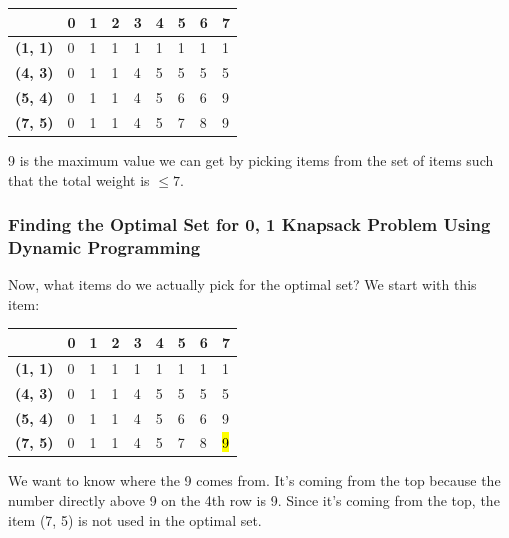 \documentclass{article}
\begin{document}
\begin{center}
\begin{tabular}{|l|l|l|l|l|l|l|l|l|}
\hline
                & \textbf{0} & \textbf{1} & \textbf{2} & \textbf{3} & \textbf{4} & \textbf{5} & \textbf{6} & \textbf{7} \\ \hline
\textbf{(1, 1)} & 0          &1            &1            &1            &1            &1            &1            &1            \\ \hline
\textbf{(4, 3)} & 0          &1            &1            &4            &5            &5            &  5          &  5          \\ \hline
\textbf{(5, 4)} & 0          &1            &1            &4            &5            &6            &6            & 9           \\ \hline
\textbf{(7, 5)} & 0          & 1           & 1           &   4         &   5         &7            & 8           &9            \\ \hline
\end{tabular}
\end{center}
9 is the maximum value we can get by picking items from the set of items such that the total weight is $\le 7$.
\newpage
\subsubsection{Finding the Optimal Set for {0, 1} Knapsack Problem Using Dynamic Programming}
Now, what items do we actually pick for the optimal set? We start with this item:
\begin{center}
\begin{tabular}{|l|l|l|l|l|l|l|l|l|}
\hline
                & \textbf{0} & \textbf{1} & \textbf{2} & \textbf{3} & \textbf{4} & \textbf{5} & \textbf{6} & \textbf{7} \\ \hline
\textbf{(1, 1)} & 0          &1            &1            &1            &1            &1            &1            &1            \\ \hline
\textbf{(4, 3)} & 0          &1            &1            &4            &5            &5            &  5          &  5          \\ \hline
\textbf{(5, 4)} & 0          &1            &1            &4            &5            &6            &6            & 9           \\ \hline
\textbf{(7, 5)} & 0          & 1           & 1           &   4         &   5         &7            & 8           &\hl{9}            \\ \hline
\end{tabular}
\end{center}
We want to know where the 9 comes from. It's coming from the top because the number directly above 9 on the 4th row is 9. Since it's coming from the top, the item (7, 5) is not used in the optimal set.
\end{document}
